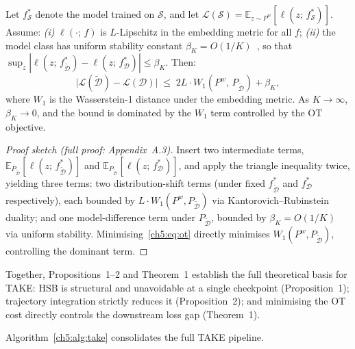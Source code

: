 \begin{foldable}
	\begin{theorem}
		Let $f^*_{\mathcal{S}}$ denote the model trained on $\mathcal{S}$, and let $\mathcal{L}(\mathcal{S}) = \mathbb{E}_{z \sim P^w}[\ell(z;\,f^*_{\mathcal{S}})]$.
		Assume: \emph{(i)} $\ell(\cdot;\,f)$ is $L$-Lipschitz in the embedding metric for all $f$; \emph{(ii)} the model class has uniform stability constant $\beta_K = O(1/K)$~\cite{bousquet2002stability}, so that $\sup_z |\ell(z;\,f^*_{\tilde{\mathcal{D}}}) - \ell(z;\,f^*_\mathcal{D})| \leq \beta_K$.
		Then:
		\begin{equation}
			\bigl|\mathcal{L}(\tilde{\mathcal{D}}) - \mathcal{L}(\mathcal{D})\bigr|
			\;\leq\; 2L \cdot W_1(P^w,\,P_{\tilde{\mathcal{D}}}) + \beta_K,
			\label{ch5:eq:gap-bound}
		\end{equation}
		where $W_1$ is the Wasserstein-1 distance under the embedding metric.
		As $K \to \infty$, $\beta_K \to 0$, and the bound is dominated by the $W_1$ term controlled by the OT objective.
	\end{theorem}
	\begin{proof}[Proof sketch (full proof: Appendix~A.3)]
		Insert two intermediate terms, $\mathbb{E}_{P_{\tilde{\mathcal{D}}}}[\ell(z;\,f^*_{\tilde{\mathcal{D}}})]$ and $\mathbb{E}_{P_{\tilde{\mathcal{D}}}}[\ell(z;\,f^*_\mathcal{D})]$, and apply the triangle inequality twice, yielding three terms: two distribution-shift terms (under fixed $f^*_{\tilde{\mathcal{D}}}$ and $f^*_\mathcal{D}$ respectively), each bounded by $L \cdot W_1(P^w, P_{\tilde{\mathcal{D}}})$ via Kantorovich--Rubinstein duality; and one model-difference term under $P_{\tilde{\mathcal{D}}}$, bounded by $\beta_K = O(1/K)$ via uniform stability.
		Minimising~\eqref{ch5:eq:ot} directly minimises $W_1(P^w, P_{\tilde{\mathcal{D}}})$, controlling the dominant term.
	\end{proof}
	Together, Propositions~1--2 and Theorem~1 establish the full theoretical basis for TAKE: HSB is structural and unavoidable at a single checkpoint (Proposition~1); trajectory integration strictly reduces it (Proposition~2); and minimising the OT cost directly controls the downstream loss gap (Theorem~1).
\end{foldable}


Algorithm~\ref{ch5:alg:take} consolidates the full TAKE pipeline.

